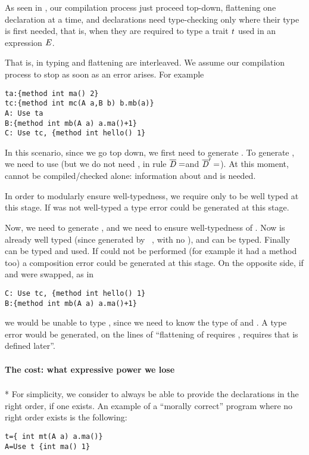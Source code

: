 As seen in , our compilation process just
proceed top-down, flattening one declaration at a time,
and declarations need type-checking
only where their type is first needed,
that is, when they are required to type a trait $\mathit{t}$ used in an expression $\mathit{E}$.

That is, in \name typing and flattening are interleaved. We assume our compilation process to stop as soon as 
an error arises. 
For example
\saveSpace\begin{lstlisting}
ta:{method int ma() 2}
tc:{method int mc(A a,B b) b.mb(a)}
A: Use ta
B:{method int mb(A a) a.ma()+1}
C: Use tc, {method int hello() 1}
\end{lstlisting}\saveSpace
In this scenario, since we go top down, we first need to generate \Q@A@.
To generate \Q@A@, we need to use \Q@ta@ (but we do not need
\Q@tc@, in rule  $\overline{\mathit{D}}=$\Q@ta@ and $\overline{\mathit{D}}'=$\Q@tc@).
At this moment, \Q@tc@ cannot be compiled/checked alone:
information about \Q@A@ and \Q@B@ is needed.

In order to modularly ensure well-typedness,
we require only \Q@ta@ to be well typed at this stage. If \Q@ta@ was not well-typed
a type error could be generated at this stage.

Now, we need to generate \Q@C@, and we need to ensure well-typedness of \Q@tc@.
Now \Q@A@ is already well typed (since generated by \use\ \Q@ta@, with no \mL),
and \Q@B@ can be typed. Finally \Q@tc@ can be typed and used.
If  could not be performed (for example it \Q@tc@ had a method \Q@hello@ too)
a composition error could be generated at this stage.
On the opposite side, if \Q@B@ and \Q@C@ were swapped, as in
\saveSpace\begin{lstlisting}
C: Use tc, {method int hello() 1}
B:{method int mb(A a) a.ma()+1}
\end{lstlisting}\saveSpace
\noindent
we would be unable to type \Q@tc@, since we need to know the type of \Q@A@ and \Q@B@.
A type error would be generated, on the lines of ``flattening of \Q@C@
requires \Q@tc@, \Q@tc@ requires \Q@B@ that is defined later''.


\paragraph{The cost: what expressive power we lose}${}_{}$\\*
For simplicity, we consider to always be able to provide the declarations in the right order, if one exists.
An example of a ``morally correct'' program where no right order exists is the following:
\saveSpace\begin{lstlisting}
t={ int mt(A a) a.ma()}
A=Use t {int ma() 1}
\end{lstlisting}\saveSpace


